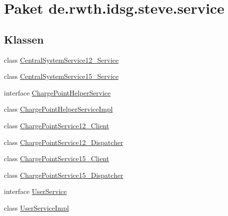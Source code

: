\hypertarget{namespacede_1_1rwth_1_1idsg_1_1steve_1_1service}{\section{Paket de.\-rwth.\-idsg.\-steve.\-service}
\label{namespacede_1_1rwth_1_1idsg_1_1steve_1_1service}
}
\subsection*{Klassen}
\begin{DoxyCompactItemize}
\item 
class \hyperlink{classde_1_1rwth_1_1idsg_1_1steve_1_1service_1_1_central_system_service12___service}{Central\-System\-Service12\-\_\-\-Service}
\item 
class \hyperlink{classde_1_1rwth_1_1idsg_1_1steve_1_1service_1_1_central_system_service15___service}{Central\-System\-Service15\-\_\-\-Service}
\item 
interface \hyperlink{interfacede_1_1rwth_1_1idsg_1_1steve_1_1service_1_1_charge_point_helper_service}{Charge\-Point\-Helper\-Service}
\item 
class \hyperlink{classde_1_1rwth_1_1idsg_1_1steve_1_1service_1_1_charge_point_helper_service_impl}{Charge\-Point\-Helper\-Service\-Impl}
\item 
class \hyperlink{classde_1_1rwth_1_1idsg_1_1steve_1_1service_1_1_charge_point_service12___client}{Charge\-Point\-Service12\-\_\-\-Client}
\item 
class \hyperlink{classde_1_1rwth_1_1idsg_1_1steve_1_1service_1_1_charge_point_service12___dispatcher}{Charge\-Point\-Service12\-\_\-\-Dispatcher}
\item 
class \hyperlink{classde_1_1rwth_1_1idsg_1_1steve_1_1service_1_1_charge_point_service15___client}{Charge\-Point\-Service15\-\_\-\-Client}
\item 
class \hyperlink{classde_1_1rwth_1_1idsg_1_1steve_1_1service_1_1_charge_point_service15___dispatcher}{Charge\-Point\-Service15\-\_\-\-Dispatcher}
\item 
interface \hyperlink{interfacede_1_1rwth_1_1idsg_1_1steve_1_1service_1_1_user_service}{User\-Service}
\item 
class \hyperlink{classde_1_1rwth_1_1idsg_1_1steve_1_1service_1_1_user_service_impl}{User\-Service\-Impl}
\end{DoxyCompactItemize}

